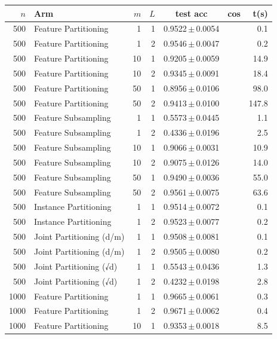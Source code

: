 \begin{table}[ht]
\centering\small
\begin{tabular}{rlrrccr}
\toprule
$n$ & Arm & $m$ & $L$ & test acc & cos & t(s) \\
\midrule
500 & Feature Partitioning & 1 & 1 & 0.9522\,$\pm$\,0.0054 &  & 0.1 \\
500 & Feature Partitioning & 1 & 2 & 0.9546\,$\pm$\,0.0047 &  & 0.2 \\
500 & Feature Partitioning & 10 & 1 & 0.9205\,$\pm$\,0.0059 &  & 14.9 \\
500 & Feature Partitioning & 10 & 2 & 0.9345\,$\pm$\,0.0091 &  & 18.4 \\
500 & Feature Partitioning & 50 & 1 & 0.8956\,$\pm$\,0.0106 &  & 98.0 \\
500 & Feature Partitioning & 50 & 2 & 0.9413\,$\pm$\,0.0100 &  & 147.8 \\
500 & Feature Subsampling & 1 & 1 & 0.5573\,$\pm$\,0.0445 &  & 1.1 \\
500 & Feature Subsampling & 1 & 2 & 0.4336\,$\pm$\,0.0196 &  & 2.5 \\
500 & Feature Subsampling & 10 & 1 & 0.9066\,$\pm$\,0.0031 &  & 10.9 \\
500 & Feature Subsampling & 10 & 2 & 0.9075\,$\pm$\,0.0126 &  & 14.0 \\
500 & Feature Subsampling & 50 & 1 & 0.9490\,$\pm$\,0.0036 &  & 55.0 \\
500 & Feature Subsampling & 50 & 2 & 0.9561\,$\pm$\,0.0075 &  & 63.6 \\
500 & Instance Partitioning & 1 & 1 & 0.9514\,$\pm$\,0.0072 &  & 0.1 \\
500 & Instance Partitioning & 1 & 2 & 0.9523\,$\pm$\,0.0077 &  & 0.2 \\
500 & Joint Partitioning (d/m) & 1 & 1 & 0.9508\,$\pm$\,0.0081 &  & 0.1 \\
500 & Joint Partitioning (d/m) & 1 & 2 & 0.9505\,$\pm$\,0.0080 &  & 0.2 \\
500 & Joint Partitioning (√d) & 1 & 1 & 0.5543\,$\pm$\,0.0436 &  & 1.3 \\
500 & Joint Partitioning (√d) & 1 & 2 & 0.4232\,$\pm$\,0.0198 &  & 2.8 \\
1000 & Feature Partitioning & 1 & 1 & 0.9665\,$\pm$\,0.0061 &  & 0.3 \\
1000 & Feature Partitioning & 1 & 2 & 0.9671\,$\pm$\,0.0062 &  & 0.4 \\
1000 & Feature Partitioning & 10 & 1 & 0.9353\,$\pm$\,0.0018 &  & 8.5 \\

\end{tabular}
\end{table}
